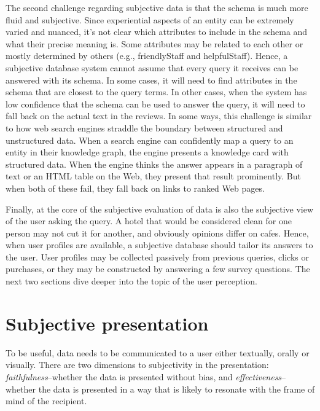 \documentclass[11pt]{article}
\begin{document}
The second challenge regarding subjective data is that the schema is much more fluid and subjective. Since experiential aspects of an entity can be extremely varied and nuanced, it's not clear which attributes  to include in the schema and what their precise meaning is. Some attributes may be related to each other or mostly determined by others (e.g., {\sc friendlyStaff} and {\sc helpfulStaff}). Hence, a subjective database system cannot assume that every query it receives can be answered with its schema. In some cases, it will need to find attributes in the schema that are closest to the query terms. In other cases, when the system has low confidence that the schema can be used to answer the query, it will need to fall back on the actual text in the reviews. In some ways, this challenge is similar to how web search engines straddle the boundary between structured and unstructured data.  When a search engine can confidently map a query to an entity in their knowledge graph, the engine presents a knowledge card with structured data.  When the engine thinks the answer appears in a paragraph of text or an HTML table on the Web, they present that result prominently. But when both of these fail, they fall back on links to ranked Web pages.  


Finally, at the core of the subjective evaluation of data is also the subjective view of the user asking the query.
A hotel that would be considered clean for one person may not cut it for another, and obviously opinions differ on cafes.  
Hence, when  user profiles are available, a subjective database should tailor its answers to the user.
 User profiles may be collected passively from previous queries, clicks or purchases, or they may be constructed by answering a few survey questions.
 The next two sections dive deeper into the topic of the user perception. 

\section{Subjective presentation}
To be useful, data needs to be communicated to a user either textually, orally or visually.  There are two dimensions to subjectivity in the presentation: {\em faithfulness}--whether the data is presented  without bias, and {\em effectiveness}--whether the data is presented in a way that is likely to resonate with the frame of mind of the recipient.
\end{document}
